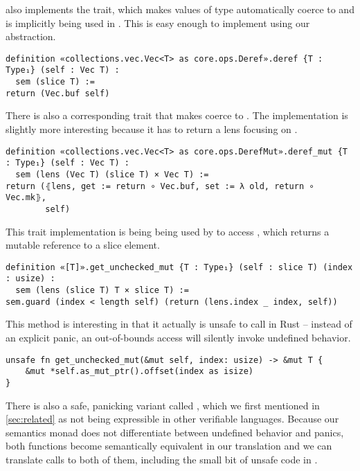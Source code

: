  also implements the  trait, which makes values of type
 automatically coerce to \rust{&[T]} and is implicitly being used
in . This is easy enough to implement using our abstraction.

\begin{verbatim}
definition «collections.vec.Vec<T> as core.ops.Deref».deref {T : Type₁} (self : Vec T) :
  sem (slice T) :=
return (Vec.buf self)
\end{verbatim}

There is also a corresponding  trait that makes  coerce to . The implementation is slightly more
interesting because it has to return a lens focusing on .

\begin{verbatim}
definition «collections.vec.Vec<T> as core.ops.DerefMut».deref_mut {T : Type₁} (self : Vec T) :
  sem (lens (Vec T) (slice T) × Vec T) :=
return (⦃lens, get := return ∘ Vec.buf, set := λ old, return ∘ Vec.mk⦄,
        self)
\end{verbatim}

This trait implementation is being being used by  to
access , which returns a mutable reference to a slice
element.

\begin{verbatim}
definition «[T]».get_unchecked_mut {T : Type₁} (self : slice T) (index : usize) :
  sem (lens (slice T) T × slice T) :=
sem.guard (index < length self) (return (lens.index _ index, self))
\end{verbatim}

This method is interesting in that it actually is unsafe to call in Rust --
instead of an explicit panic, an out-of-bounds access will silently invoke
undefined behavior.

\begin{verbatim}
unsafe fn get_unchecked_mut(&mut self, index: usize) -> &mut T {
    &mut *self.as_mut_ptr().offset(index as isize)
}
\end{verbatim}

There is also a safe, panicking variant called , which we
first mentioned in \autoref{sec:related} as not being expressible in other
verifiable languages. Because our semantics monad does not differentiate between
undefined behavior and panics, both functions become semantically equivalent in
our translation and we can translate calls to both of them, including the
small bit of unsafe code in .

